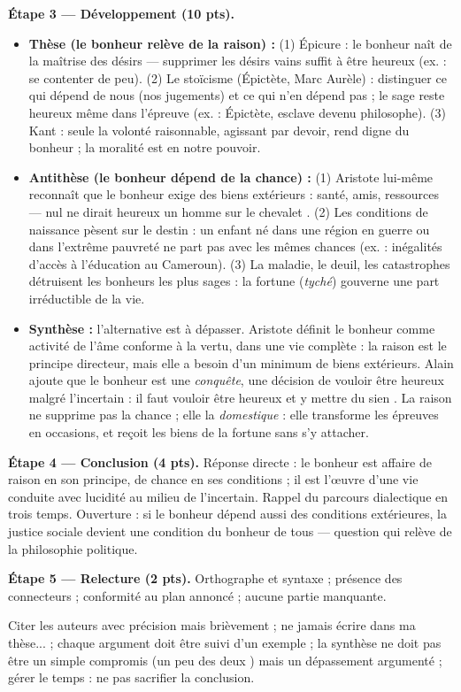 \documentclass[11pt]{article}
\begin{document}
\begin{corrige}
\textbf{Étape 3 — Développement (10 pts).}
\begin{itemize}
\item \textbf{Thèse (le bonheur relève de la raison) :} (1) Épicure : le bonheur naît de la maîtrise des désirs — supprimer les désirs vains suffit à être heureux (ex. : se contenter de peu). (2) Le stoïcisme (Épictète, Marc Aurèle) : distinguer ce qui dépend de nous (nos jugements) et ce qui n'en dépend pas ; le sage reste heureux même dans l'épreuve (ex. : Épictète, esclave devenu philosophe). (3) Kant : seule la volonté raisonnable, agissant par devoir, rend digne du bonheur ; la moralité est en notre pouvoir.
\item \textbf{Antithèse (le bonheur dépend de la chance) :} (1) Aristote lui-même reconnaît que le bonheur exige des biens extérieurs : santé, amis, ressources — \og nul ne dirait heureux un homme sur le chevalet \fg{}. (2) Les conditions de naissance pèsent sur le destin : un enfant né dans une région en guerre ou dans l'extrême pauvreté ne part pas avec les mêmes chances (ex. : inégalités d'accès à l'éducation au Cameroun). (3) La maladie, le deuil, les catastrophes détruisent les bonheurs les plus sages : la fortune (\emph{tyché}) gouverne une part irréductible de la vie.
\item \textbf{Synthèse :} l'alternative est à dépasser. Aristote définit le bonheur comme \og activité de l'âme conforme à la vertu, dans une vie complète \fg{} : la raison est le principe directeur, mais elle a besoin d'un minimum de biens extérieurs. Alain ajoute que le bonheur est une \emph{conquête}, une décision de vouloir être heureux malgré l'incertain : \og il faut vouloir être heureux et y mettre du sien \fg{}. La raison ne supprime pas la chance ; elle la \emph{domestique} : elle transforme les épreuves en occasions, et reçoit les biens de la fortune sans s'y attacher.
\end{itemize}

\textbf{Étape 4 — Conclusion (4 pts).} Réponse directe : le bonheur est affaire de raison en son principe, de chance en ses conditions ; il est l'œuvre d'une vie conduite avec lucidité au milieu de l'incertain. Rappel du parcours dialectique en trois temps. Ouverture : si le bonheur dépend aussi des conditions extérieures, la justice sociale devient une condition du bonheur de tous — question qui relève de la philosophie politique.

\textbf{Étape 5 — Relecture (2 pts).} Orthographe et syntaxe ; présence des connecteurs ; conformité au plan annoncé ; aucune partie manquante.

\begin{attention}
Citer les auteurs avec précision mais brièvement ; ne jamais écrire \og dans ma thèse... \fg{} ; chaque argument doit être suivi d'un exemple ; la synthèse ne doit pas être un simple compromis (\og un peu des deux \fg{}) mais un dépassement argumenté ; gérer le temps : ne pas sacrifier la conclusion.
\end{attention}
\end{corrige}
\end{document}
